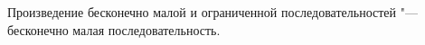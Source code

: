 
    Произведение бесконечно малой и ограниченной последовательностей "--- бесконечно малая последовательность.
